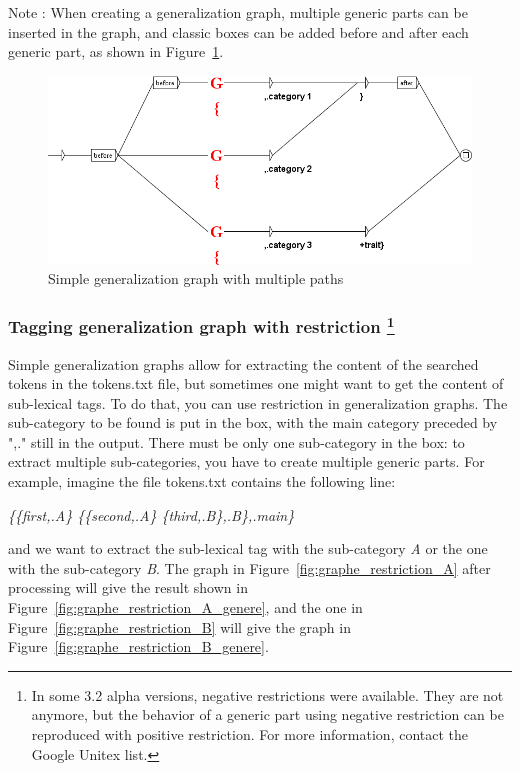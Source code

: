 \bigskip
\noindent Note : When creating a generalization graph, multiple generic parts can be inserted in the graph, and
classic boxes can be added before and after each generic part, as shown in
Figure~\ref{fig:graphe_generique_plusieurs_chemins}.

\begin{figure}[!htb]
  \centering
  \includegraphics[width=14cm]{resources/img/graphe_generique_plusieurs_chemins.png}
  \caption{Simple generalization graph with multiple paths}
  \label{fig:graphe_generique_plusieurs_chemins}
\end{figure}

\subsubsection{Tagging generalization graph with restriction \protect\footnote{ In some 3.2 alpha versions,
negative restrictions were available. They are not anymore, but the behavior of a generic part using
negative restriction can be reproduced with positive restriction. For more information, contact the
Google Unitex list.}}

Simple generalization graphs allow for extracting the content of the searched tokens in the tokens.txt file,
but sometimes one might want to get the content of sub-lexical tags. To do that, you can use restriction
in generalization graphs. The sub-category to be found is put in the box, with the main category preceded
by ",." still in the output. There must be only one sub-category in the box: to extract multiple sub-categories, 
you have to create multiple generic parts. For example, imagine the file tokens.txt contains the following line:

\bigskip
\emph{\{\{first,.A\} \{\{second,.A\} \{third,.B\},.B\},.main\}}

\bigskip
\noindent and we want to extract the sub-lexical tag with the sub-category \textit{A} or the one
with the sub-category \textit{B}.
The graph in Figure~\ref{fig:graphe_restriction_A} after processing will give the result shown in
Figure~\ref{fig:graphe_restriction_A_genere}, and the one in Figure~\ref{fig:graphe_restriction_B}
will give the graph in Figure~\ref{fig:graphe_restriction_B_genere}.

